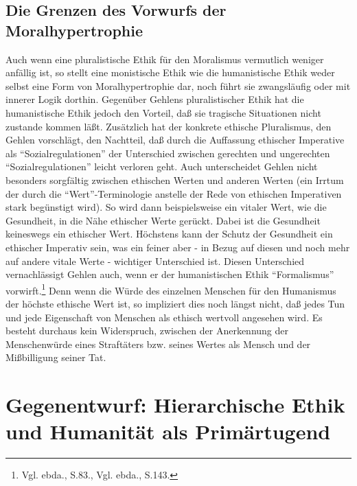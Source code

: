 \documentclass[12pt,a4paper]{article}
\begin{document}
\subsection{Die Grenzen des Vorwurfs der Moralhypertrophie}

Auch wenn eine pluralistische Ethik für den Moralismus vermutlich weniger
anfällig ist, so stellt eine monistische Ethik wie die humanistische Ethik
weder selbst eine Form von Moralhypertrophie dar, noch führt sie
zwangsläufig oder mit innerer Logik dorthin. Gegenüber Gehlens
pluralistischer Ethik hat die humanistische Ethik jedoch den Vorteil, daß
sie tragische Situationen nicht zustande kommen läßt. Zusätzlich hat der
konkrete ethische Pluralismus, den Gehlen vorschlägt, den Nachtteil, daß
durch die Auffassung ethischer Imperative als "`Sozialregulationen"' der
Unterschied zwischen gerechten und ungerechten "`Sozialregulationen"' leicht
verloren geht. Auch unterscheidet Gehlen nicht besonders sorgfältig zwischen
ethischen Werten und anderen Werten (ein Irrtum der durch die
"`Wert"'-Terminologie anstelle der Rede von ethischen Imperativen stark
begünstigt wird). So wird dann beispielsweise ein vitaler Wert, wie die
Gesundheit, in die Nähe ethischer Werte gerückt. Dabei ist die Gesundheit
keineswegs ein ethischer Wert. Höchstens kann der Schutz der Gesundheit ein
ethischer Imperativ sein, was ein feiner aber - in Bezug auf diesen und noch
mehr auf andere vitale Werte - wichtiger Unterschied ist. Diesen Unterschied
vernachlässigt Gehlen auch, wenn er der humanistischen Ethik "`Formalismus"'
vorwirft.\footnote{Vgl. ebda., S.83., Vgl. ebda., S.143.} Denn wenn die
Würde des einzelnen Menschen für den Humanismus der höchste ethische Wert
ist, so impliziert dies noch längst nicht, daß jedes Tun und jede
Eigenschaft von Menschen als ethisch wertvoll angesehen wird. Es besteht
durchaus kein Widerspruch, zwischen der Anerkennung der Menschenwürde eines
Straftäters bzw. seines Wertes als Mensch und der Mißbilligung seiner Tat.

\section{Gegenentwurf: Hierarchische Ethik und Humanität als Primärtugend}
\end{document}
